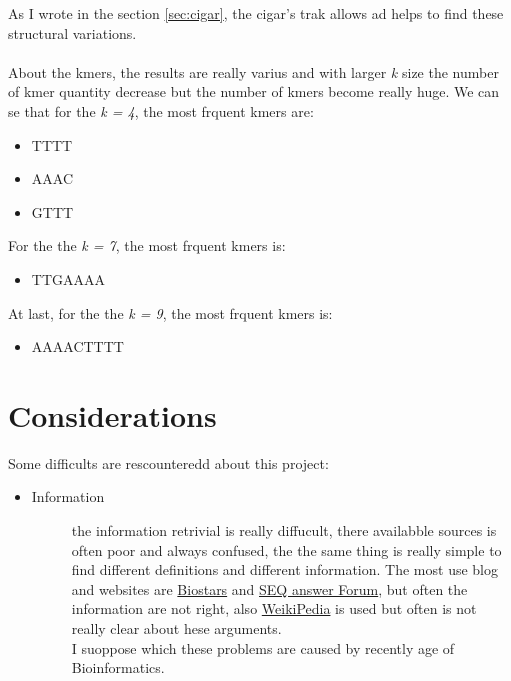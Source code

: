 As I wrote in the section \ref{sec:cigar}, the cigar's trak allows ad helps to find these structural variations.\\\\

About the kmers, the results are really varius and with larger \emph{k} size the number of kmer quantity decrease but the number of kmers become really huge.
We can se that for the \emph{k = 4}, the most frquent kmers are: 
\begin{itemize}
\item TTTT
\item AAAC
\item GTTT
\end{itemize}

For the the \emph{k = 7}, the most frquent kmers is: 

\begin{itemize}
\item TTGAAAA
\end{itemize}

At last, for the the \emph{k = 9}, the most frquent kmers is:
\begin{itemize}
\item AAAACTTTT
\end{itemize}
 
\section{Considerations}

Some difficults are rescounteredd about this project:
\begin{itemize}
\item \begin{description}
		\item[Information] the information retrivial is really diffucult, there availabble sources is often poor and always confused, the the same thing is really simple to find different definitions and different information. The most use blog and websites are \href{https://www.biostars.org/}{Biostars} and \href{http://seqanswers.com/forums/}{SEQ answer Forum}, but often the information are not right, also \href{https://it.wikipedia.org}{WeikiPedia} is used but often is not really clear about hese arguments.\\ I suoppose which these problems are caused by recently age of Bioinformatics.
  \end{description}
\end{itemize}


